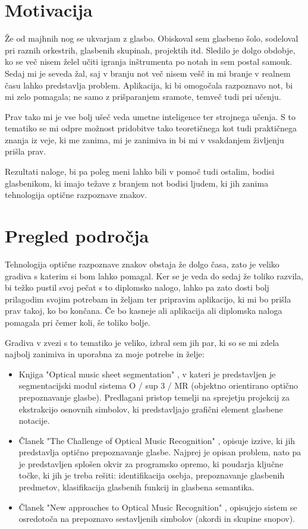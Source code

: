 \documentclass[a4paper, 12pt]{book}
\begin{document}
\chapter{Motivacija}
\label{ch0}

Že od majhnih nog se ukvarjam z glasbo. Obiskoval sem glasbeno šolo, sodeloval pri raznih orkestrih, glasbenih skupinah, projektih itd. Sledilo je dolgo obdobje, ko se več nisem želel učiti igranja inštrumenta po notah in sem postal samouk. Sedaj mi je seveda žal, saj v branju not več nisem vešč in mi branje v realnem času lahko predstavlja problem. Aplikacija, ki bi omogočala razpoznavo not, bi mi zelo pomagala; ne samo z prišparanjem sramote, temveč tudi pri učenju.

Prav tako mi je vse bolj ušeč veda umetne inteligence ter strojnega učenja. S to tematiko se mi odpre možnost pridobitve tako teoretičnega kot tudi praktičnega znanja iz veje, ki me zanima, mi je zanimiva in bi mi v vsakdanjem življenju prišla prav.

Rezultati naloge, bi pa poleg meni lahko bili v pomoč tudi ostalim, bodisi glasbenikom, ki imajo težave z branjem not bodisi ljudem, ki jih zanima tehnologija optične razpoznave znakov.


\chapter{Pregled področja}
\label{ch1}

Tehnologija optične razpoznave znakov obstaja že dolgo časa, zato je veliko gradiva s katerim si bom lahko pomagal. Ker se je veda do sedaj že toliko razvila, bi težko pustil svoj pečat s to diplomsko nalogo, lahko pa zato dosti bolj prilagodim svojim potrebam in željam ter pripravim aplikacijo, ki mi bo prišla prav takoj, ko bo končana. Če bo kasneje ali aplikacija ali diplomska naloga pomagala pri čemer koli, še toliko bolje.

Gradiva v zvezi s to tematiko je veliko, izbral sem jih par, ki so se mi zdela najbolj zanimiva in uporabna za moje potrebe in želje:
\begin{itemize}
\item
Knjiga "Optical music sheet segmentation" \cite{omss}, v kateri je predstavljen je segmentacijski modul sistema O / sup 3 / MR (objektno orientirano optično prepoznavanje glasbe). Predlagani pristop temelji na sprejetju projekcij za ekstrakcijo osnovnih simbolov, ki predstavljajo grafični element glasbene notacije.
\item
Članek "The Challenge of Optical Music Recognition" \cite{tcomr}, opisuje izzive, ki jih predstavlja optično prepoznavanje glasbe. Najprej je opisan problem, nato pa je predstavljen splošen okvir za programsko opremo, ki poudarja ključne točke, ki jih je treba rešiti: identifikacija osebja, prepoznavanje glasbenih predmetov, klasifikacija glasbenih funkcij in glasbena semantika.
\item
Članek "New approaches to Optical Music Recognition" \cite{naomr}, opisujejo sistem se osredotoča na prepoznavo sestavljenih simbolov (akordi in skupine snopov).
\end{itemize}
\end{document}
